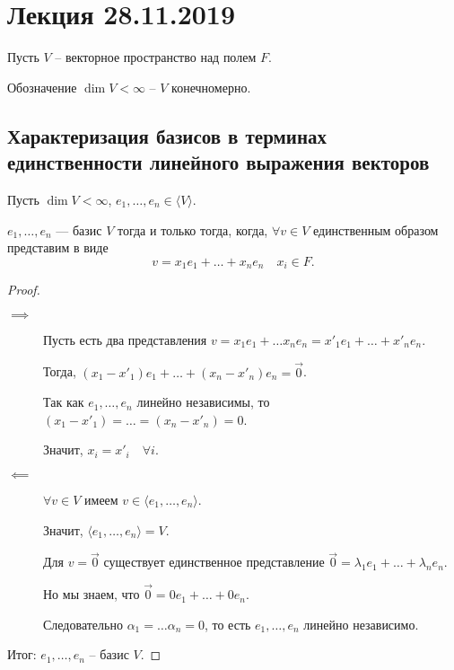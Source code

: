 \section{Лекция 28.11.2019}

Пусть $V$ -- векторное пространство над полем $F$.

Обозначение $\dim V < \infty$ -- $V$ конечномерно.

\subsection{Характеризация базисов в терминах единственности линейного выражения векторов}

\begin{proposition}
    Пусть $\dim V < \infty$, $e_1, \dots, e_n \in \langle V \rangle$.

    $e_1, \dots, e_n$ --- базис $V$ тогда и только тогда, когда, $\forall v \in V$ единственным образом представим в виде
    \begin{equation*}
        v = x_1 e_1 + \dots + x_n e_n \quad x_i \in F
    .\end{equation*}
\end{proposition}

\begin{proof}~
    \begin{description}
    \item[$\implies$]
        Пусть есть два представления $v = x_1 e_1 + \dots x_n e_n = x'_1 e_1 + \dots + x'_n e_n$.

        Тогда, $(x_1 - x'_1)e_1 + \dots + (x_n - x'_n)e_n = \overrightarrow{0}$.

        Так как $e_1, \dots, e_n$ линейно независимы, то $(x_1 - x'_1) = \dots = (x_n - x'_n) = 0$.

        Значит, $x_i = x'_i \quad \forall i$.

    \item[$\impliedby$]
        $\forall v \in V$ имеем $v \in \langle e_1, \dots, e_n \rangle$.

        Значит, $\langle e_1, \dots, e_n \rangle = V$.

        Для $v = \overrightarrow{0}$ существует единственное представление $\overrightarrow{0} = \lambda_1 e_1 + \dots + \lambda_n e_n$.

        Но мы знаем, что $\overrightarrow{0} = 0e_1 + \dots + 0e_n$.

        Следовательно $\alpha_1 = \dots \alpha_n = 0$, то есть $e_1, \dots, e_n$ линейно независимо.
    \end{description}

    Итог: $e_1, \dots, e_n$ -- базис $V$.
\end{proof}


